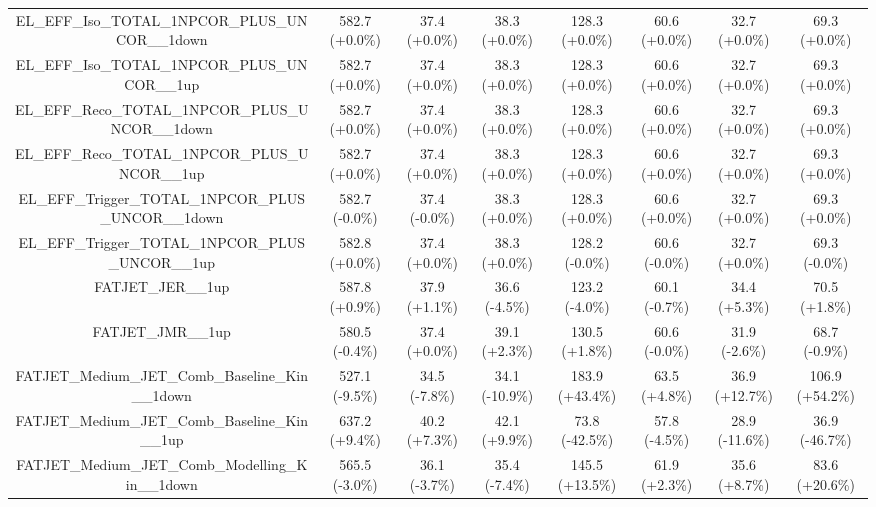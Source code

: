 \begin{table}[htbp!]
\begin{tiny}
\begin{center}
\begin{tabular}{c|c|c|c||c|c|c|c}
EL\_EFF\_Iso\_TOTAL\_1NPCOR\_PLUS\_UNCOR\_\_1down            & 582.7     (+0.0\%) & 37.4      (+0.0\%) & 38.3      (+0.0\%) & 128.3     (+0.0\%) & 60.6      (+0.0\%) & 32.7      (+0.0\%) & 69.3      (+0.0\%) \\ 
EL\_EFF\_Iso\_TOTAL\_1NPCOR\_PLUS\_UNCOR\_\_1up              & 582.7     (+0.0\%) & 37.4      (+0.0\%) & 38.3      (+0.0\%) & 128.3     (+0.0\%) & 60.6      (+0.0\%) & 32.7      (+0.0\%) & 69.3      (+0.0\%) \\ 
EL\_EFF\_Reco\_TOTAL\_1NPCOR\_PLUS\_UNCOR\_\_1down           & 582.7     (+0.0\%) & 37.4      (+0.0\%) & 38.3      (+0.0\%) & 128.3     (+0.0\%) & 60.6      (+0.0\%) & 32.7      (+0.0\%) & 69.3      (+0.0\%) \\ 
EL\_EFF\_Reco\_TOTAL\_1NPCOR\_PLUS\_UNCOR\_\_1up             & 582.7     (+0.0\%) & 37.4      (+0.0\%) & 38.3      (+0.0\%) & 128.3     (+0.0\%) & 60.6      (+0.0\%) & 32.7      (+0.0\%) & 69.3      (+0.0\%) \\ 
EL\_EFF\_Trigger\_TOTAL\_1NPCOR\_PLUS\_UNCOR\_\_1down        & 582.7     (-0.0\%) & 37.4      (-0.0\%) & 38.3      (+0.0\%) & 128.3     (+0.0\%) & 60.6      (+0.0\%) & 32.7      (+0.0\%) & 69.3      (+0.0\%) \\ 
EL\_EFF\_Trigger\_TOTAL\_1NPCOR\_PLUS\_UNCOR\_\_1up          & 582.8     (+0.0\%) & 37.4      (+0.0\%) & 38.3      (+0.0\%) & 128.2     (-0.0\%) & 60.6      (-0.0\%) & 32.7      (+0.0\%) & 69.3      (-0.0\%) \\ 
FATJET\_JER\_\_1up                                           & 587.8     (+0.9\%) & 37.9      (+1.1\%) & 36.6      (-4.5\%) & 123.2     (-4.0\%) & 60.1      (-0.7\%) & 34.4      (+5.3\%) & 70.5      (+1.8\%) \\ 
FATJET\_JMR\_\_1up                                           & 580.5     (-0.4\%) & 37.4      (+0.0\%) & 39.1      (+2.3\%) & 130.5     (+1.8\%) & 60.6      (-0.0\%) & 31.9      (-2.6\%) & 68.7      (-0.9\%) \\ 
FATJET\_Medium\_JET\_Comb\_Baseline\_Kin\_\_1down            & 527.1     (-9.5\%) & 34.5      (-7.8\%) & 34.1      (-10.9\%) & 183.9     (+43.4\%) & 63.5      (+4.8\%) & 36.9      (+12.7\%) & 106.9     (+54.2\%) \\ 
FATJET\_Medium\_JET\_Comb\_Baseline\_Kin\_\_1up              & 637.2     (+9.4\%) & 40.2      (+7.3\%) & 42.1      (+9.9\%) & 73.8      (-42.5\%) & 57.8      (-4.5\%) & 28.9      (-11.6\%) & 36.9      (-46.7\%) \\ 
FATJET\_Medium\_JET\_Comb\_Modelling\_Kin\_\_1down           & 565.5     (-3.0\%) & 36.1      (-3.7\%) & 35.4      (-7.4\%) & 145.5     (+13.5\%) & 61.9      (+2.3\%) & 35.6      (+8.7\%) & 83.6      (+20.6\%) \\ 

\end{tabular}
\end{center}
\end{tiny}
\end{table}
